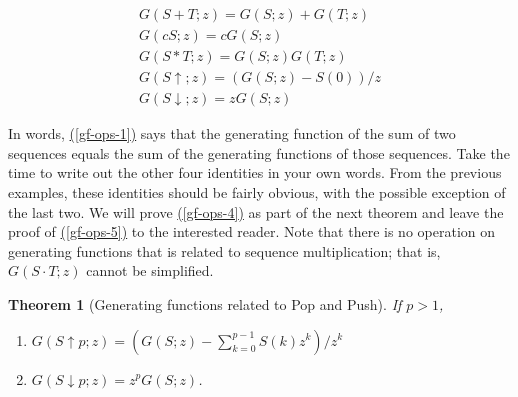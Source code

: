 \documentclass[10pt,]{book}
\theoremstyle{plain}
\newtheorem{theorem}{Theorem}[section]
\theoremstyle{definition}
\theoremstyle{definition}
\theoremstyle{definition}
\theoremstyle{definition}
\numberwithin{equation}{section}
\begin{document}
\begin{gather}
G(S+T;z)=G(S;z)+G(T;z)\label{gf-ops-1}\\
G(cS;z)=c G(S;z)\label{gf-ops-2}\\
 G(S*T;z)=G(S;z) G(T;z)\label{gf-ops-3}\\
 G(S\uparrow ;z)=(G(S;z)-S(0))/z\label{gf-ops-4}\\
 G(S\downarrow ;z)=z G(S;z)\label{gf-ops-5}
\end{gather}%
\par
In words, \hyperref[gf-ops-1]{(\ref{gf-ops-1})} says that the generating function of the sum of two sequences equals the sum of the generating functions of those sequences. Take
the time to write out the other four identities in your own words. From the previous examples, these identities should be fairly obvious, with the
possible exception of the last two. We will prove \hyperref[gf-ops-4]{(\ref{gf-ops-4})} as part of the next theorem and leave the proof of \hyperref[gf-ops-5]{(\ref{gf-ops-5})} to the interested reader. Note that
there is no operation on generating functions that is related to sequence multiplication; that is, \(G(S\cdot T;z)\) cannot be simplified.%
\begin{theorem}[Generating functions related to Pop and Push]\label{gf-of-pop-push}
If \(p > 1\),%
\par
\leavevmode%
\begin{enumerate}[label=\alph*]
\item\hypertarget{li-144}{}\(G(S\uparrow p;z) = \left(G(S;z) -\left.\sum_{k=0}^{p-1} S(k) z^k\right)/z^k\right.\)%
\item\hypertarget{li-145}{} \(G(S\downarrow p;z) = z^p G(S;z)\).%
\end{enumerate}
%
\end{theorem}
\end{document}
